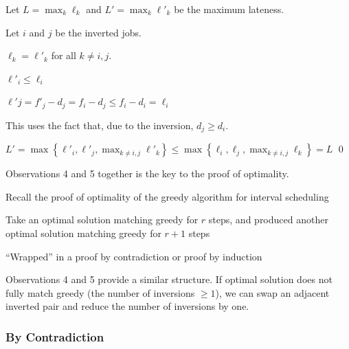 \begin{listu}
        Let $L = \max_k \ell_k$ and $L' = \max_k \ell'_k$ be the maximum lateness.

        Let $i$ and $j$ be the inverted jobs.

        \begin{listu}
            \item $\ell_k = \ell'_k$ for all $k \ne i, j$.

            \item $\ell'_i \le \ell_i$

            \item $\ell'j = f'_j - d_j = f_i - d_j \le f_i - d_i = \ell_i$

            This uses the fact that, due to the inversion, $d_j \ge d_i$.

            \item $\displaystyle L' = \max\left\{\ell'_i, \ell'_j, \max_{k \ne i, j} \ell'_k\right\} \le \max\left\{\ell_i, \ell_j, \max_{k \ne i, j} \ell_k\right\} = L$ \qed
        \end{listu}
\end{listu}

Observations 4 and 5 together is the key to the proof of optimality.

\begin{remark}
    Recall the proof of optimality of the greedy algorithm for interval scheduling

    \begin{listu}
        \item Take an optimal solution matching greedy for $r$ steps, and produced another optimal solution matching greedy for $r + 1$ steps
        \item ``Wrapped'' in a proof by contradiction or proof by induction
    \end{listu}

    Observations 4 and 5 provide a similar structure. If optimal solution does not fully match greedy (the number of inversions $\ge 1$), we can swap an adjacent inverted pair and reduce the number of inversions by one.
\end{remark}

\subsubsection{By Contradiction}

